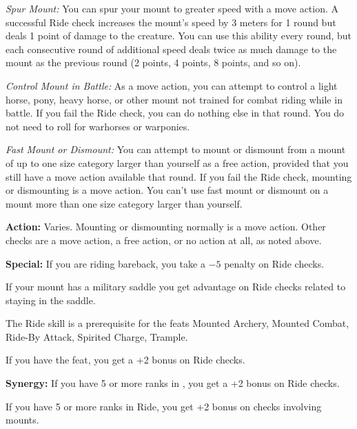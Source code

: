 \textit{Spur Mount:} You can spur your mount to greater speed with a move action. A successful Ride check increases the mount's speed by 3 meters for 1 round but deals 1 point of damage to the creature. You can use this ability every round, but each consecutive round of additional speed deals twice as much damage to the mount as the previous round (2 points, 4 points, 8 points, and so on).

\textit{Control Mount in Battle:} As a move action, you can attempt to control a light horse, pony, heavy horse, or other mount not trained for combat riding while in battle. If you fail the Ride check, you can do nothing else in that round. You do not need to roll for warhorses or warponies.

\textit{Fast Mount or Dismount:} You can attempt to mount or dismount from a mount of up to one size category larger than yourself as a free action, provided that you still have a move action available that round. If you fail the Ride check, mounting or dismounting is a move action. You can't use fast mount or dismount on a mount more than one size category larger than yourself.

\textbf{Action:} Varies. Mounting or dismounting normally is a move action. Other checks are a move action, a free action, or no action at all, as noted above.

\textbf{Special:} If you are riding bareback, you take a $-5$ penalty on Ride checks.

If your mount has a military saddle you get advantage on Ride checks related to staying in the saddle.

The Ride skill is a prerequisite for the feats Mounted Archery, Mounted Combat, Ride-By Attack, Spirited Charge, Trample.

If you have the  feat, you get a +2 bonus on Ride checks.

\textbf{Synergy:} If you have 5 or more ranks in , you get a +2 bonus on Ride checks.

If you have 5 or more ranks in Ride, you get +2 bonus on  checks involving mounts.
